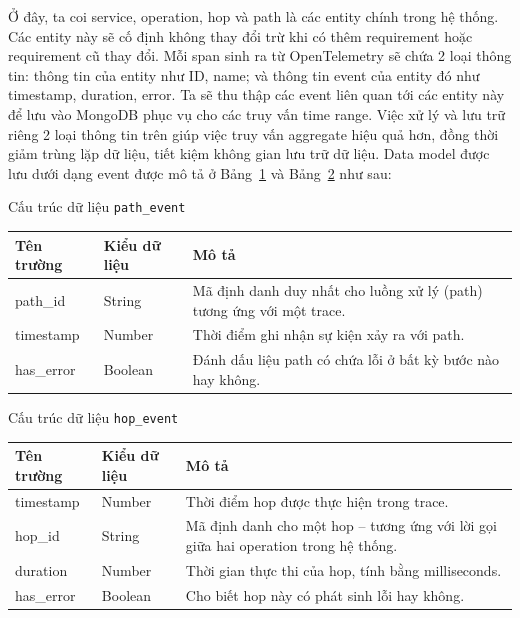 \documentclass{uetgraduation}
\begin{document}
   Ở đây, ta coi service, operation, hop và path là các entity chính trong hệ thống. Các entity này sẽ cố định không thay đổi trừ khi có thêm requirement hoặc requirement cũ thay đổi. Mỗi span sinh ra từ OpenTelemetry sẽ chứa 2 loại thông tin: thông tin của entity như ID, name; và thông tin event của entity đó như timestamp, duration, error. Ta sẽ thu thập các event liên quan tới các entity này để lưu vào MongoDB phục vụ cho các truy vấn time range. Việc xử lý và lưu trữ riêng 2 loại thông tin trên giúp việc truy vấn aggregate hiệu quả hơn, đồng thời giảm trùng lặp dữ liệu, tiết kiệm không gian lưu trữ dữ liệu. Data model được lưu dưới dạng event được mô tả ở Bảng~\ref{tab:pathevent} và Bảng~\ref{tab:hopevent} như sau:
   
    \begin{table}[H]{Cấu trúc dữ liệu \texttt{path\_event}}
\centering
\begin{tabular}{|p{4cm}|p{3.5cm}|p{7cm}|}
\hline
\textbf{Tên trường} & \textbf{Kiểu dữ liệu} & \textbf{Mô tả} \\
\hline
path\_id & String & Mã định danh duy nhất cho luồng xử lý (path) tương ứng với một trace. \\
\hline
timestamp & Number & Thời điểm ghi nhận sự kiện xảy ra với path. \\
\hline
has\_error & Boolean & Đánh dấu liệu path có chứa lỗi ở bất kỳ bước nào hay không. \\
\hline
\end{tabular}
\label{tab:pathevent}
\end{table}

   \begin{table}[H]{Cấu trúc dữ liệu \texttt{hop\_event}}
\centering
\begin{tabular}{|p{4cm}|p{3.5cm}|p{7cm}|}
\hline
\textbf{Tên trường} & \textbf{Kiểu dữ liệu} & \textbf{Mô tả} \\
\hline
timestamp & Number & Thời điểm hop được thực hiện trong trace. \\
\hline
hop\_id & String & Mã định danh cho một hop – tương ứng với lời gọi giữa hai operation trong hệ thống. \\
\hline
duration & Number & Thời gian thực thi của hop, tính bằng milliseconds. \\
\hline
has\_error & Boolean & Cho biết hop này có phát sinh lỗi hay không. \\
\hline
\end{tabular}
\label{tab:hopevent}
\end{table}
        
\end{document}
